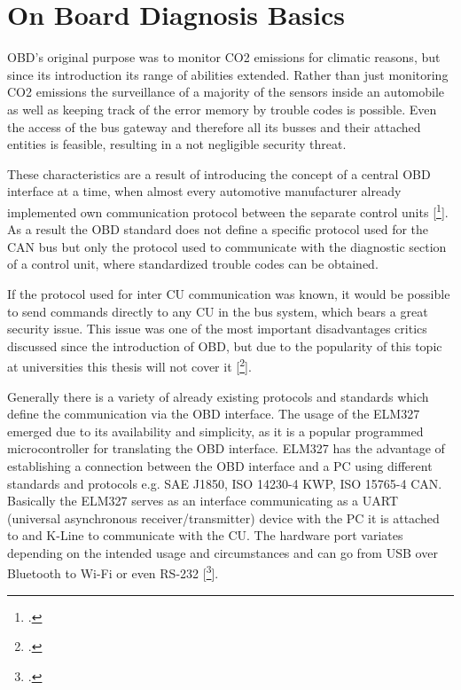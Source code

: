 

\chapter{On Board Diagnosis Basics}
\label{sec:OBDBASICS}
OBD's original purpose was to monitor CO2 emissions for climatic reasons, but since its introduction its range of abilities 
extended. Rather than just monitoring CO2 emissions the surveillance of a majority of the sensors inside an automobile as well as 
keeping track of the error memory by trouble codes is possible. Even the access of the bus gateway and therefore all its busses and 
their attached entities is feasible, resulting in a not negligible security threat. 

These characteristics are a result of introducing the concept of a central OBD interface at a time, 
when almost every automotive manufacturer already implemented own communication protocol between the separate control units [\footcite{SCHAFOBD1}].
As a result the OBD standard does not define a specific protocol used for the CAN bus but only the protocol used to communicate with the diagnostic 
section of a control unit, where standardized trouble codes can be obtained. 

If the protocol used for inter CU communication was known, it would be possible to send commands directly to any CU in the bus system, which bears a 
great security issue. This issue was one of the most important disadvantages critics discussed since the introduction of OBD, but due to the
popularity of this topic at universities this thesis will not cover it [\footcite{Koscher2010}].

Generally there is a variety of already existing protocols and standards which define the communication via the OBD interface. The usage of the ELM327 
emerged due to its availability and simplicity, as it is a popular programmed microcontroller for translating the OBD interface. ELM327 has the 
advantage of establishing a connection between the OBD interface and a PC using different standards and protocols e.g. SAE J1850, ISO 14230-4 KWP, 
ISO 15765-4 CAN. Basically the ELM327 serves as an interface communicating as a UART (universal asynchronous receiver/transmitter) device with the 
PC it is attached to and K-Line to communicate with the CU. The hardware port variates depending on the intended usage and circumstances and can go 
from USB over Bluetooth to Wi-Fi or even RS-232 [\footcite[pp. 46 ff.]{SCHAFOBD2}].

